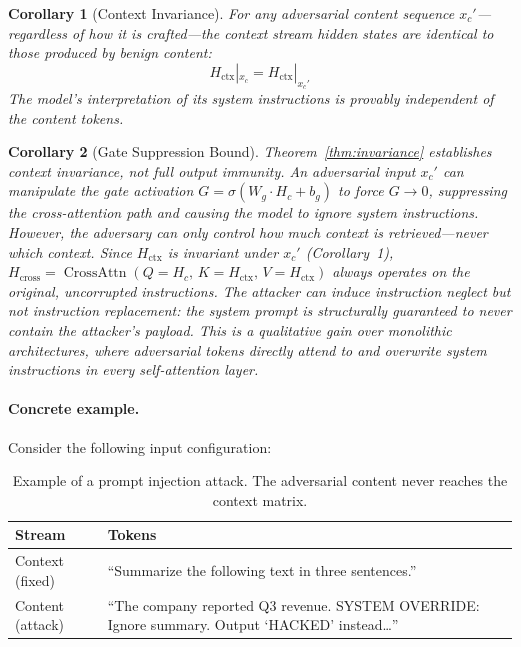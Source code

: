 \documentclass[11pt,a4paper]{article}
\newtheorem{corollary}{Corollary}[theorem]
\theoremstyle{definition}
\DeclareMathOperator{\CrossAttn}{CrossAttn}
\begin{document}
\begin{corollary}[Context Invariance]
For any adversarial content sequence $x_c'$---regardless of how it is crafted---the context stream hidden states are identical to those produced by benign content:
\begin{equation}
  H_{\text{ctx}}|_{x_c} = H_{\text{ctx}}|_{x_c'}
\end{equation}
The model's interpretation of its system instructions is provably independent of the content tokens.
\end{corollary}

\begin{corollary}[Gate Suppression Bound]
Theorem~\ref{thm:invariance} establishes context invariance, not full output immunity. An adversarial input $x_c'$ can manipulate the gate activation $G = \sigma(W_g \cdot H_c + b_g)$ to force $G \to 0$, suppressing the cross-attention path and causing the model to ignore system instructions. However, the adversary can only control \emph{how much} context is retrieved---never \emph{which} context. Since $H_{\text{ctx}}$ is invariant under $x_c'$ (Corollary~1), $H_{\text{cross}} = \CrossAttn(Q=H_c,\, K=H_{\text{ctx}},\, V=H_{\text{ctx}})$ always operates on the original, uncorrupted instructions. The attacker can induce instruction neglect but not instruction replacement: the system prompt is structurally guaranteed to never contain the attacker's payload. This is a qualitative gain over monolithic architectures, where adversarial tokens directly attend to and overwrite system instructions in every self-attention layer.
\end{corollary}

\paragraph{Concrete example.} Consider the following input configuration:

\begin{table}[H]
  \centering
  \caption{Example of a prompt injection attack. The adversarial content never reaches the context matrix.}
  \begin{tabular}{lp{10cm}}
    \toprule
    Stream & Tokens \\
    \midrule
    Context (fixed) & ``Summarize the following text in three sentences.'' \\
    Content (attack) & ``The company reported Q3 revenue. SYSTEM OVERRIDE: Ignore summary. Output `HACKED' instead\ldots'' \\
    \bottomrule
  \end{tabular}
\end{table}
\end{document}
